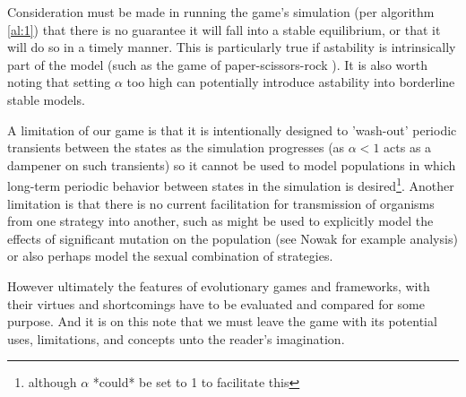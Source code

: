 Consideration must be made in running the game's simulation (per algorithm \ref{al:1}) that there is no guarantee it will fall into a stable equilibrium, or that it will do so in a timely manner. This is particularly true if astability is intrinsically part of the model (such as the game of paper-scissors-rock \cite{rockpaperscissors}). It is also worth noting that setting $\alpha$ too high can potentially introduce astability into borderline stable models.

A limitation of our game is that it is intentionally designed to 'wash-out' periodic transients between the states as the simulation progresses (as $\alpha<1$ acts as a dampener on such transients) so it cannot be used to model populations in which long-term periodic behavior between states in the simulation is desired\footnote{although $\alpha$ *could* be set to 1 to facilitate this}.
Another limitation is that there is no current facilitation for transmission of organisms from one strategy into another, such as might be used to explicitly model the effects of significant mutation on the population (see Nowak \cite{nowak} for example analysis) or also perhaps model the sexual combination of strategies.

However ultimately the features of evolutionary games and frameworks, with their virtues and shortcomings have to be evaluated and compared for some purpose.
And it is on this note that we must leave the game with its potential uses, limitations, and concepts unto the reader's imagination.

